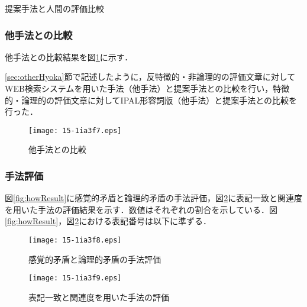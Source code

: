 \documentclass[japanese]{jnlp_1.4}
\begin{document}
\begin{table}[t]
	\caption{提案手法と人間の評価比較}
	\label{tb:ResultHikaku}

\vspace{-1\baselineskip}
\end{table}

\subsubsection{他手法との比較}

他手法との比較結果を図\ref{fig:otherResult}に示す．

\ref{sec:otherHyoka}節で記述したように，反特徴的・非論理的の評価文章に対してWEB検索システムを用いた手法（他手法）と提案手法との比較を行い，特徴的・論理的の評価文章に対してIPAL形容詞版（他手法）と提案手法との比較を行った．

\begin{figure}[h]
	\begin{center}
\vspace{-1\baselineskip}
    \texttt{[image: 15-1ia3f7.eps]}
		\caption{他手法との比較}
		\label{fig:otherResult}
	\end{center}
\vspace{-1\baselineskip}
\end{figure}


\subsubsection{手法評価}

図\ref{fig:howResult}に感覚的矛盾と論理的矛盾の手法評価，図\ref{fig:howResult2}に表記一致と関連度を用いた手法の評価結果を示す．数値はそれぞれの割合を示している．図\ref{fig:howResult}，図\ref{fig:howResult2}における表記番号は以下に準ずる．

\begin{figure}[t]
  \begin{minipage}{.48\linewidth}
\begin{center}
    \texttt{[image: 15-1ia3f8.eps]}
		\caption{感覚的矛盾と論理的矛盾の手法評価}
		\label{fig:howResult}
	\end{center}
  \end{minipage}
  \begin{minipage}{.48\linewidth}
		\begin{center}
    \texttt{[image: 15-1ia3f9.eps]}
		\caption{表記一致と関連度を用いた手法の評価}
		\label{fig:howResult2}
	\end{center}
    \end{minipage}
\end{figure}
\end{document}
